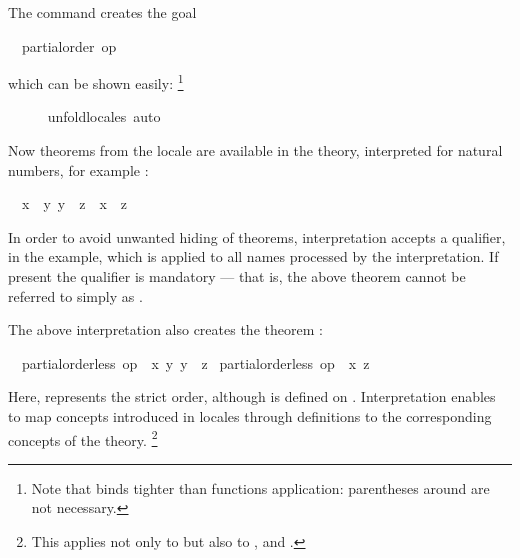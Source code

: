 \begin{isabellebody}
\begin{isamarkuptxt}
  The command creates the goal \begin{isabelle}%
\ {}{\isachardot}\ partial{\isacharunderscore}order\ op\ {\isasymle}%
\end{isabelle} which can be shown
  easily:%
\footnote{Note that  binds tighter than functions
  application: parentheses around  are not necessary.}%
\end{isamarkuptxt}%
\isamarkuptrue%
\ \ \ \ \isamarkupfalse%
\ unfold{\isacharunderscore}locales\ auto%
\endisatagvisible
{\isafoldvisible}%
%
\isadelimvisible
%
\endisadelimvisible
%
\begin{isamarkuptext}%
Now theorems from the locale are available in the theory,
  interpreted for natural numbers, for example : \begin{isabelle}%
\ \ {\isasymlbrakk}{\isacharquery}x\ {\isasymle}\ {\isacharquery}y{\isacharsemicolon}\ {\isacharquery}y\ {\isasymle}\ {\isacharquery}z{\isasymrbrakk}\ {\isasymLongrightarrow}\ {\isacharquery}x\ {\isasymle}\ {\isacharquery}z%
\end{isabelle}

  In order to avoid unwanted hiding of theorems, interpretation
  accepts a qualifier,  in the example, which is applied to
  all names processed by the
  interpretation.  If present the qualifier is mandatory --- that is,
  the above theorem cannot be referred to simply as .%
\end{isamarkuptext}%
\isamarkuptrue%
%
\isamarkuptrue%
%
\begin{isamarkuptext}%
The above interpretation also creates the theorem
  : \begin{isabelle}%
\ \ {\isasymlbrakk}partial{\isacharunderscore}order{\isachardot}less\ op\ {\isasymle}\ {\isacharquery}x\ {\isacharquery}y{\isacharsemicolon}\ {\isacharquery}y\ {\isasymle}\ {\isacharquery}z{\isasymrbrakk}\isanewline
\isaindent{\ \ }{\isasymLongrightarrow}\ partial{\isacharunderscore}order{\isachardot}less\ op\ {\isasymle}\ {\isacharquery}x\ {\isacharquery}z%
\end{isabelle}
  Here, 
  represents the strict order, although \isa{{\isacharless}} is defined on
  .  Interpretation enables to map concepts
  introduced in locales through definitions to the corresponding
  concepts of the theory.%
\footnote{This applies not only to  but also to
  ,  and .}%
\end{isamarkuptext}%
\isamarkuptrue%
%
\isadelimtheory
%
\endisadelimtheory
%
\isatagtheory
%
\endisatagtheory
{\isafoldtheory}%
%
\isadelimtheory
%
\endisadelimtheory
\end{isabellebody}%
